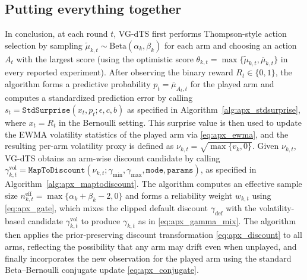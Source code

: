 \subsection{Putting everything together}
In conclusion, at each round $t$, VG-dTS first performs Thompson-style action selection by sampling $\widetilde{\mu}_{k,t}\sim \mathrm{Beta}(\alpha_k,\beta_k)$ for each arm and choosing an action $A_t$ with the largest score (using the optimistic score $\theta_{k,t}=\max\{\widetilde{\mu}_{k,t},\bar{\mu}_{k,t}\}$ in every reported experiment).
After observing the binary reward $R_t\in\{0,1\}$, the algorithm forms a predictive probability $p_t=\bar{\mu}_{A_t,t}$ for the played arm and computes a standardized prediction error by calling
$s_t=\texttt{StdSurprise}(x_t,p_t;\epsilon,c,b)$ as specified in Algorithm~\ref{alg:apx_stdsurprise}, where $x_t=R_t$ in the Bernoulli setting.
This surprise value is then used to update the EWMA volatility statistics of the played arm via \eqref{eq:apx_ewma}, and the resulting per-arm volatility proxy is defined as $\nu_{k,t}=\sqrt{\max\{v_k,0\}}$.
Given $\nu_{k,t}$, VG-dTS obtains an arm-wise discount candidate by calling $\gamma^{\mathrm{vol}}_{k,t}=\texttt{MapToDiscount}(\nu_{k,t};\gamma_{\min},\gamma_{\max},\texttt{mode},\texttt{params})$, as specified in Algorithm~\ref{alg:apx_maptodiscount}.
The algorithm computes an effective sample size $n^{\mathrm{eff}}_{k,t}=\max\{\alpha_k+\beta_k-2,0\}$ and forms a reliability weight $w_{k,t}$ using \eqref{eq:apx_gate}, which mixes the clipped default discount $\gamma_{\mathrm{def}}$ with the volatility-based candidate $\gamma^{\mathrm{vol}}_{k,t}$ to produce $\gamma_{k,t}$ as in \eqref{eq:apx_gamma_mix}.
The algorithm then applies the prior-preserving discount transformation \eqref{eq:apx_discount} to all arms, reflecting the possibility that any arm may drift even when unplayed, and finally incorporates the new observation for the played arm using the standard Beta--Bernoulli conjugate update \eqref{eq:apx_conjugate}.

